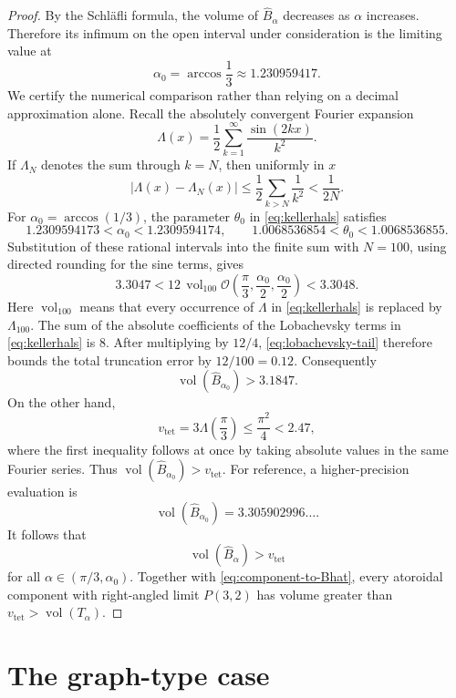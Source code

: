 \documentclass[12pt,a4paper]{article}
\theoremstyle{definition}
\DeclareMathOperator{\Vol}{vol}
\newcommand{\vtet}{v_{\mathrm{tet}}}
\begin{document}
\begin{proof}
By the Schl\"afli formula, the volume of \(\widehat B_\alpha\) decreases as
\(\alpha\) increases. Therefore its infimum on the open interval under
consideration is the limiting value at
\[
        \alpha_0=\arccos\frac13\approx1.230959417 .
\]
We certify the numerical comparison rather than relying on a decimal
approximation alone.  Recall the absolutely convergent Fourier expansion
\[
 \Lambda(x)=\frac12\sum_{k=1}^{\infty}\frac{\sin(2kx)}{k^2}.
\]
If \(\Lambda_N\) denotes the sum through \(k=N\), then uniformly in \(x\)
\begin{equation}\label{eq:lobachevsky-tail}
 \left|\Lambda(x)-\Lambda_N(x)\right|
 \le \frac12\sum_{k>N}\frac1{k^2}<\frac1{2N}.
\end{equation}
For \(\alpha_0=\arccos(1/3)\), the parameter \(\theta_0\) in
\eqref{eq:kellerhals} satisfies
\[
 1.2309594173<\alpha_0<1.2309594174,
 \qquad
 1.0068536854<\theta_0<1.0068536855.
\]
Substitution of these rational intervals into the finite sum with \(N=100\),
using directed rounding for the sine terms, gives
\[
 3.3047<
 12\,\Vol_{100}\mathcal O
 \left(\frac{\pi}{3},\frac{\alpha_0}{2},
                    \frac{\alpha_0}{2}\right)
 <3.3048.
\]
Here \(\Vol_{100}\) means that every occurrence of \(\Lambda\) in
\eqref{eq:kellerhals} is replaced by \(\Lambda_{100}\).
The sum of the absolute coefficients of the Lobachevsky terms in
\eqref{eq:kellerhals} is \(8\).  After multiplying by \(12/4\),
\eqref{eq:lobachevsky-tail} therefore bounds the total truncation error by
\(12/100=0.12\).  Consequently
\[
        \Vol(\widehat B_{\alpha_0})>3.1847.
\]
On the other hand,
\[
 \vtet=3\Lambda\left(\frac{\pi}{3}\right)
 \le \frac{\pi^2}{4}<2.47,
\]
where the first inequality follows at once by taking absolute values in the
same Fourier series.  Thus
\(\Vol(\widehat B_{\alpha_0})>\vtet\).  For reference, a higher-precision
evaluation is
\[
        \Vol(\widehat B_{\alpha_0})=3.305902996\ldots .
\]
It follows that
\[
        \Vol(\widehat B_\alpha)>\vtet
\]
for all \(\alpha\in(\pi/3,\alpha_0)\).  Together with
\eqref{eq:component-to-Bhat}, every atoroidal component with
right-angled limit \(P(3,2)\) has volume greater than
\(\vtet>\Vol(T_\alpha)\).
\end{proof}








\section{The graph-type case}\label{sec:prismatic}
\end{document}
